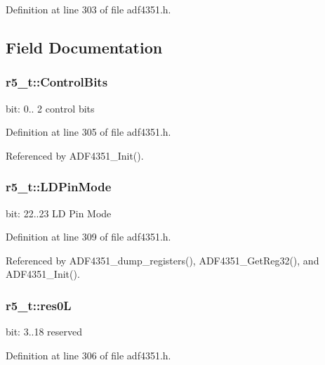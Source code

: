 Definition at line 303 of file adf4351.\+h.



\subsection{Field Documentation}
\subsubsection[{\texorpdfstring{Control\+Bits}{ControlBits}}]{ r5\+\_\+t\+::\+Control\+Bits}\hypertarget{structr5__t_aa71c458a3167da85d477b00cf0ae346a}{}\label{structr5__t_aa71c458a3167da85d477b00cf0ae346a}
bit\+: 0.. 2 control bits 

Definition at line 305 of file adf4351.\+h.



Referenced by A\+D\+F4351\+\_\+\+Init().

\subsubsection[{\texorpdfstring{L\+D\+Pin\+Mode}{LDPinMode}}]{ r5\+\_\+t\+::\+L\+D\+Pin\+Mode}\hypertarget{structr5__t_a55135418b639eabcc007205a689dd828}{}\label{structr5__t_a55135418b639eabcc007205a689dd828}
bit\+: 22..23 LD Pin Mode 

Definition at line 309 of file adf4351.\+h.



Referenced by A\+D\+F4351\+\_\+dump\+\_\+registers(), A\+D\+F4351\+\_\+\+Get\+Reg32(), and A\+D\+F4351\+\_\+\+Init().

\subsubsection[{\texorpdfstring{res0L}{res0L}}]{ r5\+\_\+t\+::res0L}\hypertarget{structr5__t_ac295706ea60257469bdd2074f7ec3197}{}\label{structr5__t_ac295706ea60257469bdd2074f7ec3197}
bit\+: 3..18 reserved 

Definition at line 306 of file adf4351.\+h.



